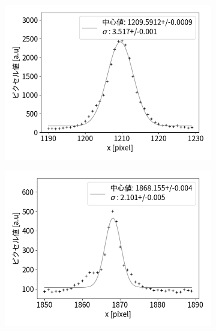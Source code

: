 \documentclass[a4paper,11pt,uplatex]{jsbook}
\begin{document}
\begin{figure}[h]
  \centering
  \begin{subfigure}[h]{0.3\linewidth}
    \centering
    \includegraphics[width=\linewidth]{image/4-fpeak.png}
  \end{subfigure}
  \hfill
  \begin{subfigure}[h]{0.3\linewidth}
    \centering
    \includegraphics[width=\linewidth]{image/4-speak.png}
  \end{subfigure}
  \hfill
  \begin{subfigure}[h]{0.3\linewidth}
    \centering

\end{subfigure}
\end{figure}
\end{document}
